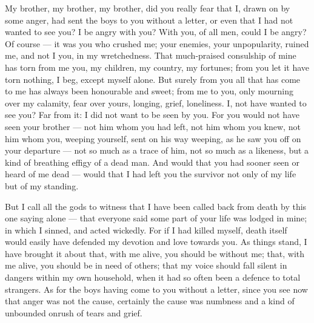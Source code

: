

 My brother, my brother, my brother, did you really fear that I, drawn on by some anger, had sent the boys to you without a letter, or even that I had not wanted to see you? I be angry with you? With you, of all men, could I be angry? Of course --- it was you who crushed me; your enemies, your unpopularity, ruined me, and not I you, in my wretchedness. That much-praised consulship of mine has torn from me you, my children, my country, my fortunes; from you let it have torn nothing, I beg, except myself alone. But surely from you all that has come to me has always been honourable and sweet; from me to you, only mourning over my calamity, fear over yours, longing, grief, loneliness. I, not have wanted to see you? Far from it: I did not want to be seen by you. For you would not have seen your brother --- not him whom you had left, not him whom you knew, not him whom you, weeping yourself, sent on his way weeping, as he saw you off on your departure --- not so much as a trace of him, not so much as a likeness, but a kind of breathing effigy of a dead man. And would that you had sooner seen or heard of me dead --- would that I had left you the survivor not only of my life but of my standing.

 But I call all the gods to witness that I have been called back from death by this one saying alone --- that everyone said some part of your life was lodged in mine; in which I sinned, and acted wickedly. For if I had killed myself, death itself would easily have defended my devotion and love towards you. As things stand, I have brought it about that, with me alive, you should be without me; that, with me alive, you should be in need of others; that my voice should fall silent in dangers within my own household, when it had so often been a defence to total strangers. As for the boys having come to you without a letter, since you see now that anger was not the cause, certainly the cause was numbness and a kind of unbounded onrush of tears and grief.

